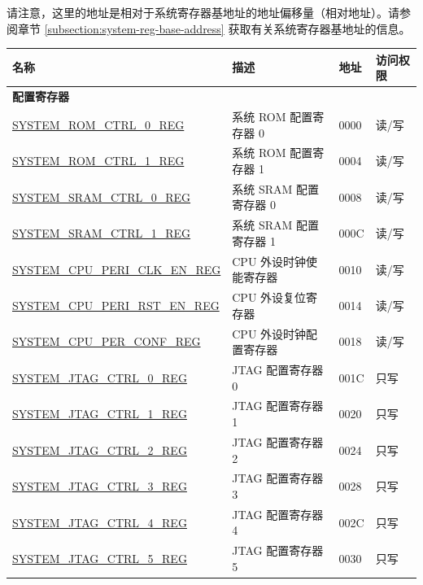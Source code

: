 请注意，这里的地址是相对于系统寄存器基地址的地址偏移量（相对地址）。请参阅章节 \ref{subsection:system-reg-base-address} 获取有关系统寄存器基地址的信息。

\begin{longtable}{ | p{7cm} | p{7cm} | p{1.3cm} | p{1cm} | }
\hline\rowcolor{lightgray}
名称 & 描述 & 地址 & 访问权限 \\ \hline
\endhead
\multicolumn{4}{|l|}{\textbf{配置寄存器}} \\ \hline
\hyperref[regdesc:SYSTEMROMCTRL0REG]{SYSTEM\_ROM\_CTRL\_0\_REG} & 系统 ROM 配置寄存器 0 & \hexprefix{}0000 & 读/写 \\ \hline
\hyperref[regdesc:SYSTEMROMCTRL1REG]{SYSTEM\_ROM\_CTRL\_1\_REG} & 系统 ROM 配置寄存器 1 & \hexprefix{}0004 & 读/写 \\ \hline
\hyperref[regdesc:SYSTEMSRAMCTRL0REG]{SYSTEM\_SRAM\_CTRL\_0\_REG} & 系统 SRAM 配置寄存器 0 & \hexprefix{}0008 & 读/写 \\ \hline
\hyperref[regdesc:SYSTEMSRAMCTRL1REG]{SYSTEM\_SRAM\_CTRL\_1\_REG} & 系统 SRAM 配置寄存器 1 & \hexprefix{}000C & 读/写 \\ \hline
\hyperref[regdesc:SYSTEMCPUPERICLKENREG]{SYSTEM\_CPU\_PERI\_CLK\_EN\_REG} & CPU 外设时钟使能寄存器 & \hexprefix{}0010 & 读/写 \\ \hline
\hyperref[regdesc:SYSTEMCPUPERIRSTENREG]{SYSTEM\_CPU\_PERI\_RST\_EN\_REG} & CPU 外设复位寄存器 & \hexprefix{}0014 & 读/写 \\ \hline
\hyperref[regdesc:SYSTEMCPUPERCONFREG]{SYSTEM\_CPU\_PER\_CONF\_REG} & CPU 外设时钟配置寄存器 & \hexprefix{}0018 & 读/写 \\ \hline
\hyperref[regdesc:SYSTEMJTAGCTRL0REG]{SYSTEM\_JTAG\_CTRL\_0\_REG} & JTAG 配置寄存器 0 & \hexprefix{}001C & 只写 \\ \hline
\hyperref[regdesc:SYSTEMJTAGCTRL1REG]{SYSTEM\_JTAG\_CTRL\_1\_REG} & JTAG 配置寄存器 1 & \hexprefix{}0020 & 只写 \\ \hline
\hyperref[regdesc:SYSTEMJTAGCTRL2REG]{SYSTEM\_JTAG\_CTRL\_2\_REG} & JTAG 配置寄存器 2 & \hexprefix{}0024 & 只写 \\ \hline
\hyperref[regdesc:SYSTEMJTAGCTRL3REG]{SYSTEM\_JTAG\_CTRL\_3\_REG} & JTAG 配置寄存器 3 & \hexprefix{}0028 & 只写 \\ \hline
\hyperref[regdesc:SYSTEMJTAGCTRL4REG]{SYSTEM\_JTAG\_CTRL\_4\_REG} & JTAG 配置寄存器 4 & \hexprefix{}002C & 只写 \\ \hline
\hyperref[regdesc:SYSTEMJTAGCTRL5REG]{SYSTEM\_JTAG\_CTRL\_5\_REG} & JTAG 配置寄存器 5 & \hexprefix{}0030 & 只写 \\ \hline

\end{longtable}
